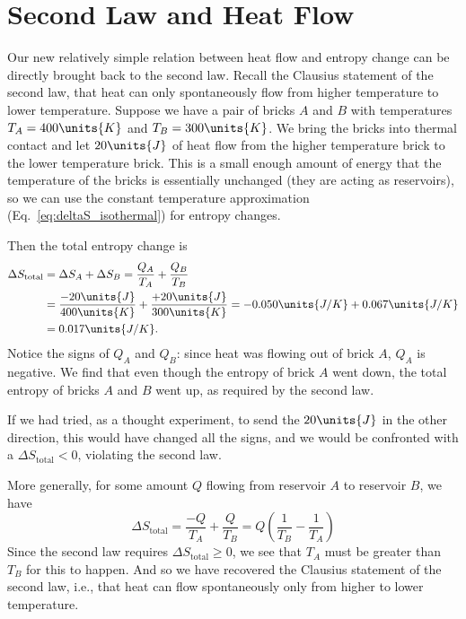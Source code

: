 \section{Second Law and Heat Flow}

Our new relatively simple relation between heat flow and entropy
change can be directly brought back to the second law.  Recall the
Clausius statement of the second law, that heat can only spontaneously
flow from higher temperature to lower temperature.  Suppose we have a
pair of bricks $A$ and $B$ with temperatures $T_A=400\units{K}$ and 
$T_B=300\units{K}$.  We bring the bricks into thermal contact and let
$20\units{J}$ of heat flow from the higher temperature brick to the
lower temperature brick.  This is a small enough amount of energy that
the temperature of the bricks is essentially unchanged (they are
acting as reservoirs), so we can use the constant temperature
approximation (Eq.~\ref{eq:deltaS_isothermal}) for entropy changes.

Then the total entropy change is
\begin{align}
\Delta S_\text{total}&= \Delta S_A + \Delta S_B = \frac{Q_A}{T_A} +
\frac{Q_B}{T_B} \nonumber\\
 &= \frac{-20\units{J}}{400\units{K}} + \frac{+20\units{J}}{300\units{K}} 
= -0.050\units{J/K} + 0.067\units{J/K} \nonumber\\
 &= 0.017\units{J/K}.
\end{align}
Notice the signs of $Q_A$ and $Q_B$: since heat was flowing out of
brick $A$, $Q_A$ is negative.  We find that even though the entropy of
brick $A$ went down, the total entropy of bricks $A$ and $B$ went up,
as required by the second law.

If we had tried, as a thought experiment, to send the $20\units{J}$ in
the other direction, this would have changed all the signs, and we
would be confronted with a $\Delta S_\text{total}<0$, violating the
second law.

More generally, for some amount $Q$ flowing from reservoir $A$ to
reservoir $B$, we have
\begin{equation}
  \Delta S_\text{total}= \frac{-Q}{T_A} + \frac{Q}{T_B}= 
  Q\left(\frac{1}{T_B}-\frac{1}{T_A}\right)
\end{equation}   
Since the second law requires $\Delta S_\text{total}\geq 0$, we see
that $T_A$ must be greater than $T_B$ for this to happen.  And so we
have recovered the Clausius statement of the second law, i.e.,
that heat can flow spontaneously only from higher to lower
temperature.

